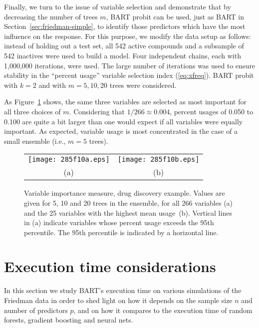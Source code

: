 \documentclass[aoas,nameyear,dvips]{arximspdf}
\begin{document}
Finally, we turn to the issue of variable selection and demonstrate
that by decreasing the number of trees $m$, BART probit can be used,
just as BART in Section~\ref{sec:friedman-simple}, to identify those predictors which have
the most influence on the \mbox{response}.  For this purpose, we modify the
data setup as follows: instead of holding out a test set, all 542 active
compounds and a subsample of 542 inactives were used to build a model.
Four independent chains, each with 1,000,000 iterations, were used.  The
large number of iterations was used to ensure stability in the
``percent usage'' variable selection index (\ref{eq:xfreq}).
BART probit with $k=2$ and
with $m = 5, 10, 20$ trees were considered.

As Figure~\ref{fig:usage} shows,
the same three variables are selected as most
important for all three choices of $m$.
Considering that $1/266 \approx 0.004$, percent usages of 0.050 to
0.100 are quite a bit larger than one would expect if all variables were
equally important.  As expected, variable usage is most concentrated in the
case of a small ensemble (i.e., $m=5$ trees).

\begin{figure}
\begin{tabular}{@{}cc@{}}

\texttt{[image: 285f10a.eps]}
&\texttt{[image: 285f10b.eps]}\\
(a)&(b)
\end{tabular}
 \caption{Variable importance measure, drug discovery example.  Values are
given for 5, 10 and 20 trees in the ensemble, for all 266 variables \textup{(a)} and
the 25 variables with the highest mean usage~\textup{(b)}.  Vertical lines in \textup{(a)}
indicate variables whose percent usage exceeds the 95th percentile.  The
95th percentile is indicated by a horizontal line.}\label{fig:usage}
\end{figure}

\section{Execution time considerations}\label{sec:executiontime}

In this section we study BART's execution time on various simulations of the Friedman data
 in order to shed light on how it depends on the sample size $n$ and
number of predictors $p$, and on how it compares to the execution time
of random forests, gradient boosting and neural nets.
\end{document}
